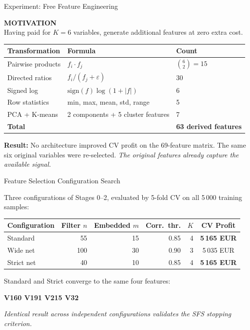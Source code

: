 \documentclass[aspectratio=169,10pt]{beamer}
\newcommand{\slabel}[1]{\textbf{\tiny\MakeUppercase{#1}}\\[0.25em]}
\begin{document}
\begin{frame}{Experiment: Free Feature Engineering}

\slabel{Motivation}
Having paid for $K=6$ variables, generate additional features at zero extra cost.

\vspace{0.3em}
\begin{center}
\footnotesize
\begin{tabular}{@{}lll@{}}
\toprule
Transformation & Formula & Count \\
\midrule
Pairwise products & $f_i \cdot f_j$ & $\binom{6}{2}=15$ \\
Directed ratios   & $f_i/(f_j+\varepsilon)$ & 30 \\
Signed log        & $\mathrm{sign}(f)\log(1+|f|)$ & 6 \\
Row statistics    & min, max, mean, std, range & 5 \\
PCA + K-means     & 2 components + 5 cluster features & 7 \\
\midrule
\textbf{Total} & & \textbf{63 derived features} \\
\bottomrule
\end{tabular}
\end{center}

\vspace{0.35em}
{\footnotesize\textbf{Result:} No architecture improved CV profit on the 69-feature matrix. The same six original variables were re-selected. \textit{The original features already capture the available signal.}}
\end{frame}

\begin{frame}{Feature Selection Configuration Search}

Three configurations of Stages 0--2, evaluated by 5-fold CV on all 5\,000 training samples:

\vspace{0.4em}
\begin{center}
\footnotesize
\begin{tabular}{@{}lrrrrc@{}}
\toprule
Configuration & Filter $n$ & Embedded $m$ & Corr.\ thr. & $K$ & CV Profit \\
\midrule
Standard   & 55  & 15 & 0.85 & 4 & \textbf{5\,165 EUR} \\
Wide net   & 100 & 30 & 0.90 & 3 & 5\,035 EUR \\
Strict net & 40  & 10 & 0.85 & 4 & \textbf{5\,165 EUR} \\
\bottomrule
\end{tabular}
\end{center}

\vspace{0.4em}
Standard and Strict converge to the same four features:
\begin{center}
\textbf{V160 \quad V191 \quad V215 \quad V32}
\end{center}

{\footnotesize\itshape Identical result across independent configurations validates the SFS stopping criterion.}
\end{frame}
\end{document}
